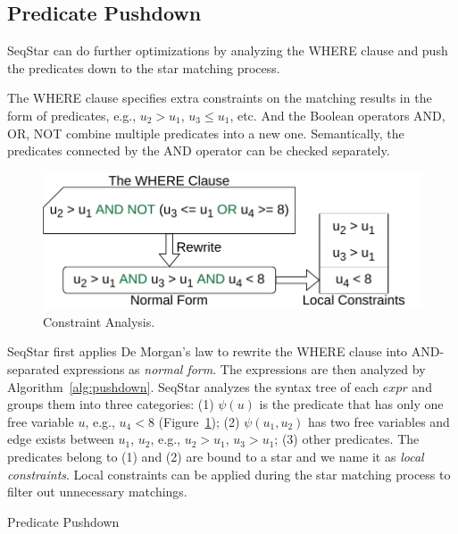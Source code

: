 \subsection{Predicate Pushdown}\label{sec:match_optimize}
SeqStar can do further optimizations by analyzing the WHERE clause and push the predicates down to the star matching process.

The WHERE clause specifies extra constraints on the matching results in the form of predicates,
e.g., $u_2 > u_1$, $u_3 \le u_1$, etc.
And the Boolean operators AND, OR, NOT combine multiple predicates into a new one.
Semantically, the predicates connected by the AND operator can be checked separately.

\begin{figure}[ht]
  \centering
  \includegraphics[width=.4\textwidth]{img/constraints.pdf}
  \caption{Constraint Analysis.}\label{img:constraints}
\end{figure}

SeqStar first applies De Morgan's law to rewrite the WHERE clause into AND-separated expressions as \emph{normal form}.
The expressions are then analyzed by Algorithm~\ref{alg:pushdown}.
SeqStar analyzes the syntax tree of each $expr$ and groups them into three categories:
(1) $\psi(u)$ is the predicate that has only one free variable $u$, e.g., $u_4 < 8$ (Figure~\ref{img:constraints});
(2) $\psi(u_1, u_2)$ has two free variables and edge exists between $u_1$, $u_2$, e.g., $u_2 > u_1$, $u_3 > u_1$;
(3) other predicates.
The predicates belong to (1) and (2) are bound to a star and we name it as \emph{local constraints}.
Local constraints can be applied during the star matching process to filter out unnecessary matchings.

\begin{algorithm}[ht]
  \caption{Predicate Pushdown}\label{alg:pushdown}
\end{algorithm}

